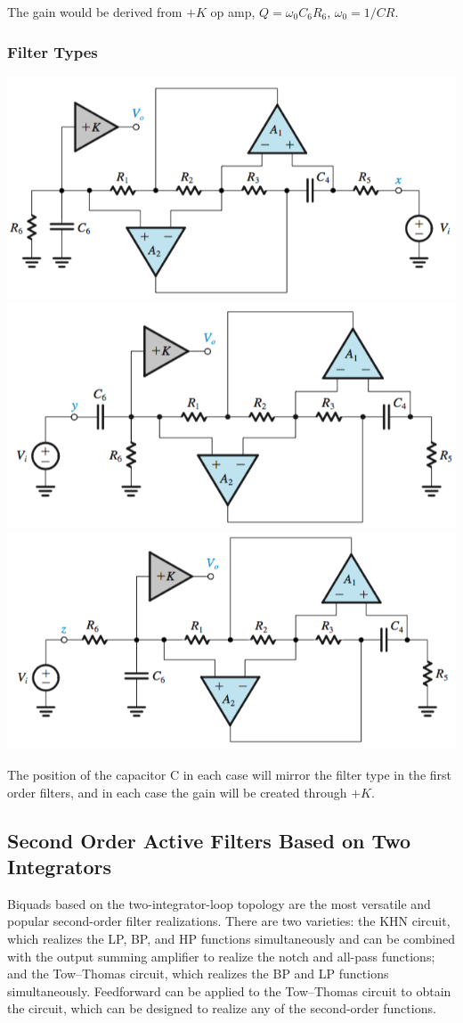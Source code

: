 \documentclass[11pt]{article}
\begin{document}
    The gain would be derived from $+K$ op amp, $Q = \omega_0C_6R_6$, $\omega_0 = 1/CR$.

    \subsubsection{Filter Types}
    \begin{center}
    \includegraphics[width=300 px]{lp-antoniou} \\ 

    \includegraphics[width=300 px]{hp-antoniou} \\ 
    
    \includegraphics[width=300 px]{bp-antoniou}
    \end{center}

    The position of the capacitor C in each case will mirror the filter type in the first order filters, and in each case the gain will be created through $+K$.

    \subsection{Second Order Active Filters Based on Two Integrators}
    Biquads based on the two-integrator-loop topology are the most versatile and popular second-order filter realizations. There are two varieties: the KHN circuit, which realizes the LP, BP, and HP functions simultaneously and can be combined with the output summing amplifier to realize the notch and all-pass functions; and the Tow–Thomas circuit, which realizes the BP and LP functions simultaneously. Feedforward can be applied to the Tow–Thomas circuit to obtain the circuit, which can be designed to realize any of the second-order functions.
\end{document}
